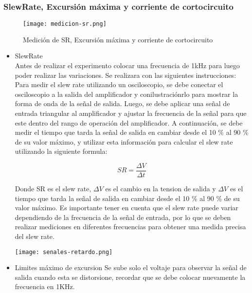 \subsubsection{SlewRate, Excursión máxima y corriente de cortocircuito}

\begin{figure}[ht]
    \centering
    \texttt{[image: medicion-sr.png]}
    \caption{Medición de SR, Excursión máxima y corriente de cortocircuito}
    \label{fig:medicion-sr}
\end{figure}

\begin{itemize}
    \item SlewRate \\
    Antes de realizar el experimento colocar una frecuencia de 1kHz para luego poder realizar las variaciones. Se realizara con las siguientes instrucciones: Para medir el slew rate utilizando un osciloscopio, se debe conectar el osciloscopio a la salida del amplificador y conilustraciónrlo para mostrar la forma de onda de la señal de salida. Luego, se debe aplicar una señal de entrada triangular al amplificador y ajustar la frecuencia de la señal para que este dentro del rango de operación del amplificador. A continuación, se debe medir el tiempo que tarda la señal de salida en cambiar desde el 10 \% al 90 \% de su valor máximo, y utilizar esta información para calcular el slew rate utilizando la siguiente formula:

    $$SR = \frac{\Delta V}{\Delta t}$$

    Donde SR es el slew rate, $\Delta V$ es el cambio en la tension de salida y $\Delta V$ es el tiempo que tarda la señal de salida en cambiar desde el 10 \% al 90 \% de su valor máximo. Es importante tener en cuenta que el slew rate puede variar dependiendo de la frecuencia de la señal de entrada, por lo que se deben realizar mediciones en diferentes frecuencias para obtener una medida precisa del slew rate.

    \begin{ilustracion}[ht]
        \centering
        \texttt{[image: senales-retardo.png]}
        \caption{Comparación tiempo de retardo entre señal de entrada y de salida debido al S.R de la variación de la frecuencia}
        \label{ilus:comparacion-funciones-sr}
    \end{ilustracion}

    \item Limites máximo de excursion
    Se sube solo el voltaje para observar la señal de salida cuando esta se distorsione, recordar que se debe colocar nuevamente la frecuencia en 1KHz.


\end{itemize}
